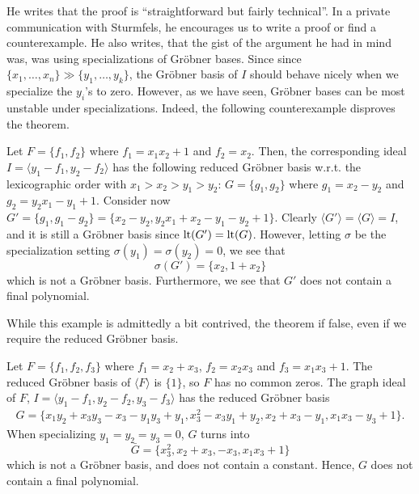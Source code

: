 He writes that the proof is ``straightforward but fairly technical''. In a private communication\cite{NL_to_BS} with Sturmfels, he encourages us to write a proof or find a counterexample. He also writes, that the gist of the argument he had in mind was, was using specializations of Gröbner bases. Since since $\{x_{1}, \dots, x_{n}\} \gg \{y_{1}, \dots, y_{k}\}$, the Gröbner basis of $I$ should behave nicely when we specialize the $y_{i}$'s to zero. However, as we have seen, Gröbner bases can be most unstable under specializations. Indeed, the following counterexample disproves the theorem.

\begin{example}\upshape
  Let $F = \{f_{1}, f_{2}\}$ where $f_{1} = x_{1} x_{2} + 1$ and $f_{2} = x_{2}$. Then, the corresponding ideal
  $I = \langle y_{1} - f_{1}, y_{2} - f_{2} \rangle$ has the following reduced Gröbner basis w.r.t. the lexicographic order with $x_{1} > x_{2} > y_{1} > y_{2}$: $G =  \{g_{1}, g_{2}\}$ where $g_{1} = x_{2} - y_{2}$ and $ g_{2} = y_{2}x_{1} - y_{1} + 1$. Consider now $G' = \{g_{1}, g_{1} - g_{2}\} = \{x_{2} - y_{2}, y_{2}x_{1} + x_{2} - y_{1} - y_{2} + 1\}$. Clearly $\langle G' \rangle = \langle G \rangle = I$, and it is still a Gröbner basis since $\operatorname{lt}(G') = \operatorname{lt}(G)$. However, letting $\sigma$ be the specialization setting $\sigma(y_{1}) = \sigma(y_{2}) = 0$, we see that
  \[\sigma(G') = \{x_{2}, 1+x_{2}\}\]
  which is not a Gröbner basis. Furthermore, we see that $G'$ does not contain a final polynomial.
\end{example}

While this example is admittedly a bit contrived, the theorem if false, even if we require the reduced Gröbner basis.

\begin{example}\upshape
    Let $F = \{f_1, f_2, f_3\}$ where $f_1 = x_2 + x_3$, $f_2 = x_2 x_3$ and $f_3 = x_1 x_3 + 1$. The reduced Gröbner basis of $\langle F \rangle$ is $\{1\}$, so $F$ has no common zeros. The graph ideal of $F$, $I = \langle y_1 - f_1, y_2 - f_2, y_3 - f_3 \rangle$ has the reduced Gröbner basis
    \begin{gather*}
    G = \{ x_1 y_2 + x_3 y_3 - x_3 - y_1 y_3 + y_1, x_3^2 - x_3 y_1 + y_2, x_2 + x_3 - y_1, x_1 x_3 - y_3 + 1\}.
    \end{gather*}
    When specializing $y_1 = y_2 = y_3 = 0$, $G$ turns into
    \[\bar G = \{ x_3^2, x_2 + x_3, -x_3, x_1 x_3 + 1\}\]
    which is not a Gröbner basis, and does not contain a constant. Hence, $G$ does not contain a final polynomial.
\end{example}


